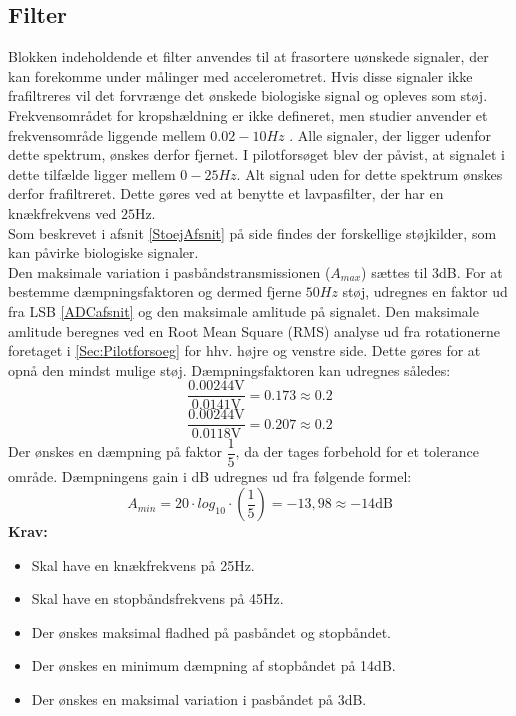 \subsection{Filter}\label{FilterAfs}
Blokken indeholdende et filter anvendes til at frasortere uønskede signaler, der kan forekomme under målinger med accelerometret. Hvis disse signaler ikke frafiltreres vil det forvrænge det ønskede biologiske signal og opleves som støj. Frekvensområdet for kropshældning er ikke defineret, men studier anvender et frekvensområde liggende mellem $0.02-10Hz$ \cite{Martinez-Mendez2011}. Alle signaler, der ligger udenfor dette spektrum, ønskes derfor fjernet. I pilotforsøget blev der påvist, at signalet i dette tilfælde ligger mellem $0-25Hz$. Alt signal uden for dette spektrum ønskes derfor frafiltreret. Dette gøres ved at benytte et lavpasfilter, der har en knækfrekvens ved $25$Hz. \\
Som beskrevet i afsnit \ref{StoejAfsnit} på side \pageref{StoejAfsnit} findes der forskellige støjkilder, som kan påvirke biologiske signaler. \\
Den maksimale variation i pasbåndstransmissionen ($A_{max}$) sættes til 3dB. For at bestemme dæmpningsfaktoren og dermed fjerne $50Hz$ støj, udregnes en faktor ud fra LSB \ref{ADCafsnit} og den maksimale amlitude på signalet. Den maksimale amlitude beregnes ved en Root Mean Square (RMS) analyse ud fra rotationerne foretaget i \ref{Sec:Pilotforsoeg} for hhv. højre og venstre side. Dette gøres for at opnå den mindst mulige støj. Dæmpningsfaktoren kan udregnes således:
\begin{equation}
\dfrac{0.00244\text{V}}{0.0141\text{V}} = 0.173 \approx 0.2 
\end{equation}
\begin{equation}
\dfrac{0.00244\text{V}}{0.0118\text{V}} = 0.207  \approx 0.2
\end{equation}
Der ønskes en dæmpning på faktor $\dfrac{1}{5}$, da der tages forbehold for et tolerance område. Dæmpningens gain i dB udregnes ud fra følgende formel:   
\begin{equation}
A_{min}=20 \cdot log_{10} \cdot (\frac{1}{5}) = -13,98 \approx -14\text{dB}
\end{equation}
\textbf{Krav:}
\begin{itemize}
	\item Skal have en knækfrekvens på 25Hz.
	\item Skal have en stopbåndsfrekvens på 45Hz.
	\item Der ønskes maksimal fladhed på pasbåndet og stopbåndet.
	\item Der ønskes en minimum dæmpning af stopbåndet på 14dB.
	\item Der ønskes en maksimal variation i pasbåndet på 3dB.
\end{itemize}

